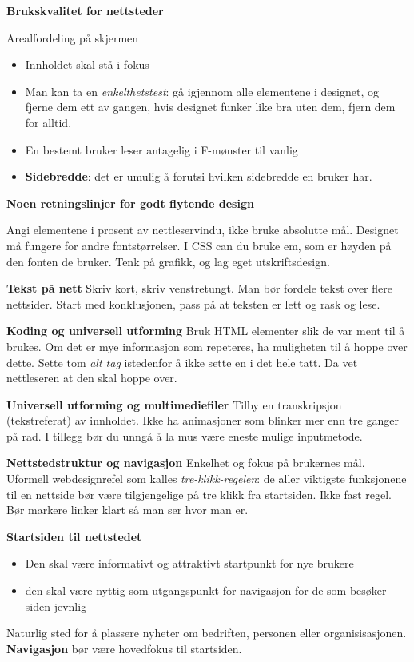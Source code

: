 \documentclass{article}
\begin{document}
\begin{flushleft}
\textbf{Brukskvalitet for nettsteder}
\bigskip

Arealfordeling på skjermen
\begin{itemize}
    \item Innholdet skal stå i fokus
    \item Man kan ta en \emph{enkelthetstest}: gå igjennom alle elementene i designet, og fjerne dem ett av gangen, hvis designet funker like bra uten dem, fjern dem for alltid. 
    \item En bestemt bruker leser antagelig i F-mønster til vanlig
    \item \textbf{Sidebredde}: det er umulig å forutsi hvilken sidebredde en bruker har. 
\end{itemize}

\textbf{Noen retningslinjer for godt flytende design}\par
Angi elementene i prosent av nettleservindu, ikke bruke absolutte mål. 
Designet må fungere for andre fontstørrelser. 
I CSS can du bruke em, som er høyden på den fonten de bruker.
Tenk på grafikk, og lag eget utskriftsdesign.
\par
\bigskip
\textbf{Tekst på nett}
Skriv kort, skriv venstretungt. Man bør fordele tekst over flere nettsider. 
Start med konklusjonen, pass på at teksten er lett og rask og lese. 
\par
\bigskip
\textbf{Koding og universell utforming}
Bruk HTML elementer slik de var ment til å brukes. 
Om det er mye informasjon som repeteres, ha muligheten til å hoppe over dette.
Sette tom \emph{alt tag} istedenfor å ikke sette en i det hele tatt. Da vet nettleseren at den skal hoppe over.
\par
\bigskip
\textbf{Universell utforming og multimediefiler}
Tilby en transkripsjon (tekstreferat) av innholdet.
Ikke ha animasjoner som blinker mer enn tre ganger på rad.
I tillegg bør du unngå å la mus være eneste mulige inputmetode.
\par
\bigskip
\textbf{Nettstedstruktur og navigasjon}
Enkelhet og fokus på brukernes mål. 
Uformell webdesignrefel som kalles \emph{tre-klikk-regelen}: 
de aller viktigste funksjonene til en nettside bør være tilgjengelige på tre klikk fra startsiden. 
Ikke fast regel. Bør markere linker klart så man ser hvor man er.
\par
\bigskip
\textbf{Startsiden til nettstedet}
\begin{itemize}
    \item Den skal være informativt og attraktivt startpunkt for nye brukere
    \item den skal være nyttig som utgangspunkt for navigasjon for de som besøker siden jevnlig
\end{itemize}
Naturlig sted for å plassere nyheter om bedriften, personen eller organisisasjonen. 
\textbf{Navigasjon} bør være hovedfokus til startsiden.



\end{flushleft}
\end{document}
